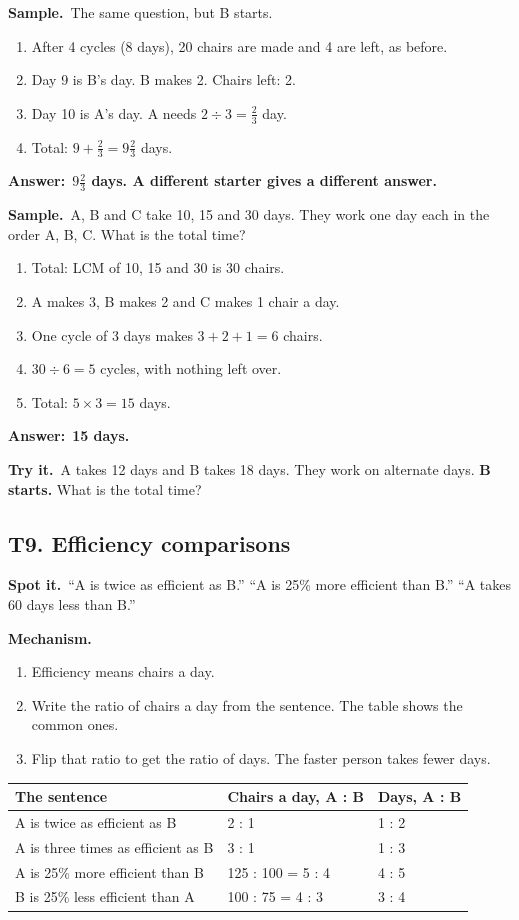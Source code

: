\documentclass[11pt,a4paper]{article}
\let\oldsubsection\subsection
\renewcommand{\subsection}{\needspace{9\baselineskip}\oldsubsection}
\newcommand{\spot}{\textbf{\color{ember}Spot it.}\ }
\newcommand{\mech}{\textbf{\color{ember}Mechanism.}\ }
\newif\ifkeepsamp
\newcommand{\ans}[1]{\par\nopagebreak\noindent\textbf{\color{ember}Answer:}\ \textbf{#1}\par}
\newcommand{\samp}{\ifkeepsamp\needspace{4\baselineskip}\fi\textbf{\color{ember}Sample.}\ }
\newcommand{\tryit}[1]{\textbf{\color{ember}Try it.}\ #1}
\begin{document}
\samp The same question, but B starts.
\begin{enumerate}
\item After 4 cycles (8 days), 20 chairs are made and 4 are left, as before.
\item Day 9 is B's day. B makes 2. Chairs left: 2.
\item Day 10 is A's day. A needs $2 \div 3 = \tfrac23$ day.
\item Total: $9 + \tfrac23 = 9\tfrac23$ days.
\end{enumerate}
\ans{$9\tfrac23$ days. A different starter gives a different answer.}

\samp A, B and C take 10, 15 and 30 days. They work one day each in the order A, B, C. What is the total time?
\begin{enumerate}
\item Total: LCM of 10, 15 and 30 is 30 chairs.
\item A makes 3, B makes 2 and C makes 1 chair a day.
\item One cycle of 3 days makes $3 + 2 + 1 = 6$ chairs.
\item $30 \div 6 = 5$ cycles, with nothing left over.
\item Total: $5 \times 3 = 15$ days.
\end{enumerate}
\ans{15 days.}

\tryit A takes 12 days and B takes 18 days. They work on alternate days. \textbf{B starts.} What is the total time?

\subsection{T9. Efficiency comparisons}
\spot ``A is twice as efficient as B.'' ``A is 25\% more efficient than B.'' ``A takes 60 days less than B.''

\mech
\begin{enumerate}
\item Efficiency means chairs a day.
\item Write the ratio of chairs a day from the sentence. The table shows the common ones.
\item Flip that ratio to get the ratio of days. The faster person takes fewer days.
\end{enumerate}

\begin{center}\small\renewcommand{\arraystretch}{1.18}\setlength{\tabcolsep}{9pt}
\begin{tabular}{@{}lll@{}}
\toprule
\textbf{\color{slate}The sentence} & \textbf{\color{slate}Chairs a day, A : B} & \textbf{\color{slate}Days, A : B} \\ \midrule
A is twice as efficient as B & 2 : 1 & 1 : 2 \\
A is three times as efficient as B & 3 : 1 & 1 : 3 \\
A is 25\% more efficient than B & 125 : 100 = 5 : 4 & 4 : 5 \\
B is 25\% less efficient than A & 100 : 75 = 4 : 3 & 3 : 4 \\
\bottomrule
\end{tabular}\end{center}
\end{document}
